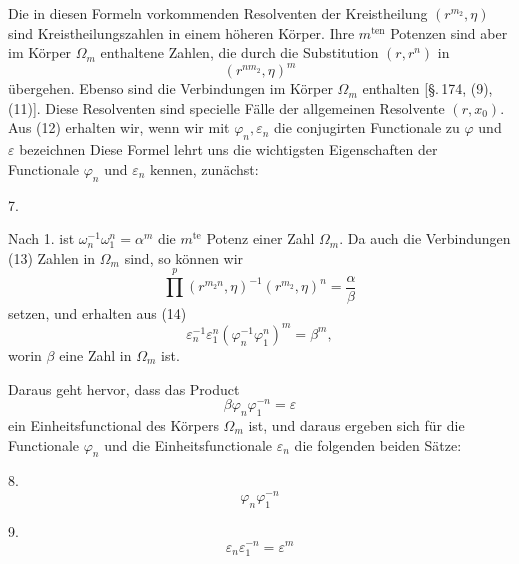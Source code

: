 
Die in diesen Formeln vorkommenden Resolventen der Kreistheilung
$(r^{m_2}, \eta)$ sind Kreistheilungszahlen in einem h\"oheren
K\"orper. Ihre $m^{\text{ten}}$ Potenzen sind aber im K\"orper
$\Omega_m$ enthaltene Zahlen, die durch die Substitution $(r, r^n)$
in
\[
(r^{n m_2}, \eta)^m
\]
\"ubergehen. Ebenso sind die Verbindungen
im K\"orper $\Omega_m$ enthalten [\S.\,174, (9), (11)]. Diese
Resolventen sind specielle F\"alle der allgemeinen Resolvente
$(r, x_0)$. Aus (12) erhalten wir, wenn wir mit $\varphi_n,
\varepsilon_n$ die conjugirten Functionale zu $\varphi$ und
$\varepsilon$ bezeichnen
Diese Formel lehrt uns die wichtigsten Eigenschaften der
Functionale $\varphi_n$ und $\varepsilon_n$ kennen, zun\"achst:

7. 

Nach 1. ist $\omega_n^{-1} \omega_1^n = \alpha^m$ die %
$m^{\text{te}}$ Potenz einer Zahl $\Omega_m$. Da auch die
Verbindungen (13) Zahlen in $\Omega_m$ sind, so k\"onnen wir
\[
\prod^{p} (r^{m_2 n}, \eta)^{-1} (r^{m_2}, \eta)^n = \frac{\alpha}{\beta}
\]
setzen, und erhalten aus (14)
\[
\varepsilon_n^{-1} \varepsilon_1^n (\varphi_n^{-1} \varphi_1^n)^m = \beta^m,
\]
worin $\beta$ eine Zahl in $\Omega_m$ ist.

Daraus geht hervor, dass das Product
\[
\beta \varphi_n \varphi_1^{-n} = \varepsilon
\]
ein Einheitsfunctional des K\"orpers $\Omega_m$ ist, und daraus
ergeben sich f\"ur die Functionale $\varphi_n$ und die
Einheitsfunctionale $\varepsilon_n$ die folgenden beiden S\"atze:

8. 
\[
\varphi_n \varphi_1^{-n}
\]

9. 
\[
\varepsilon_n \varepsilon_1^{-n} = \varepsilon^m
\]
